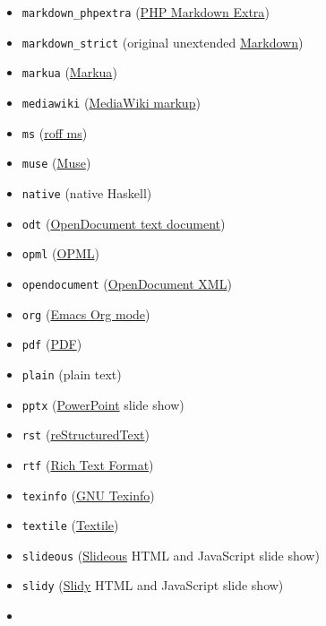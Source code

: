 \documentclass[
  b5paper
]{book}
\begin{document}
\begin{description}
\begin{itemize}
\item
  \texttt{markdown\_phpextra}
  (\href{https://michelf.ca/projects/php-markdown/extra/}{PHP Markdown
  Extra})
\item
  \texttt{markdown\_strict} (original unextended
  \href{https://daringfireball.net/projects/markdown/}{Markdown})
\item
  \texttt{markua} (\href{https://leanpub.com/markua/read}{Markua})
\item
  \texttt{mediawiki}
  (\href{https://www.mediawiki.org/wiki/Help:Formatting}{MediaWiki
  markup})
\item
  \texttt{ms} (\href{https://man.cx/groff_ms(7)}{roff ms})
\item
  \texttt{muse} (\href{https://amusewiki.org/library/manual}{Muse})
\item
  \texttt{native} (native Haskell)
\item
  \texttt{odt}
  (\href{https://en.wikipedia.org/wiki/OpenDocument}{OpenDocument text
  document})
\item
  \texttt{opml} (\href{http://dev.opml.org/spec2.html}{OPML})
\item
  \texttt{opendocument}
  (\href{https://www.oasis-open.org/2021/06/16/opendocument-v1-3-oasis-standard-published/}{OpenDocument
  XML})
\item
  \texttt{org} (\href{https://orgmode.org}{Emacs Org mode})
\item
  \texttt{pdf} (\href{https://www.adobe.com/pdf/}{PDF})
\item
  \texttt{plain} (plain text)
\item
  \texttt{pptx}
  (\href{https://en.wikipedia.org/wiki/Microsoft_PowerPoint}{PowerPoint}
  slide show)
\item
  \texttt{rst}
  (\href{https://docutils.sourceforge.io/docs/ref/rst/introduction.html}{reStructuredText})
\item
  \texttt{rtf}
  (\href{https://en.wikipedia.org/wiki/Rich_Text_Format}{Rich Text
  Format})
\item
  \texttt{texinfo} (\href{https://www.gnu.org/software/texinfo/}{GNU
  Texinfo})
\item
  \texttt{textile} (\href{https://textile-lang.com}{Textile})
\item
  \texttt{slideous}
  (\href{https://goessner.net/articles/slideous/}{Slideous} HTML and
  JavaScript slide show)
\item
  \texttt{slidy} (\href{https://www.w3.org/Talks/Tools/Slidy2/}{Slidy}
  HTML and JavaScript slide show)
\item

\end{itemize}
\end{description}
\end{document}
